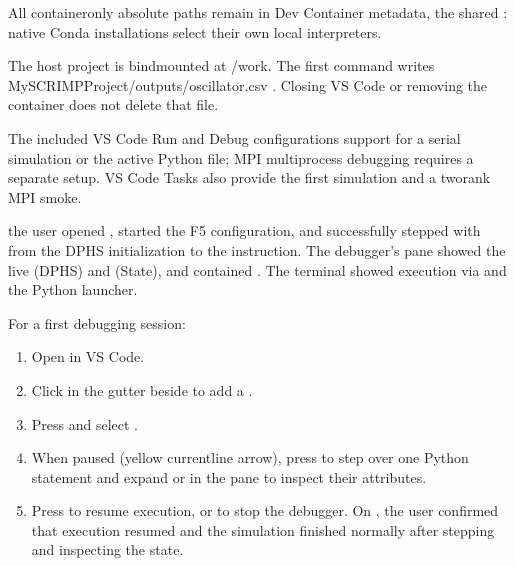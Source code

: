 \documentclass[letterpaper,10pt,english]{sphinxmanual}
\begin{document}
\sphinxAtStartPar
All container\sphinxhyphen{}only absolute paths remain in Dev Container
metadata,  the shared : native
Conda installations select their own local interpreters.

\sphinxAtStartPar
The host project is bind\sphinxhyphen{}mounted at /work. The first command
writes MySCRIMPProject/outputs/oscillator.csv .
Closing VS Code or removing the container does not delete that file.

\sphinxAtStartPar
The included VS Code Run and Debug configurations support 
for a serial simulation or the active Python file; MPI multiprocess
debugging requires a separate setup. VS Code Tasks also provide
the first simulation and a two\sphinxhyphen{}rank MPI smoke.

\sphinxAtStartPar
{} the user
opened , started the
 F5 configuration, and successfully
stepped with  from the DPHS initialization to the
 instruction. The
debugger’s  pane showed the live  (DPHS)
and  (State), and  contained .
The terminal showed execution via
 and the Python
 launcher.

\sphinxAtStartPar
For a first debugging session:
\begin{enumerate}
%
\item {} 
\sphinxAtStartPar
Open  in VS Code.

\item {} 
\sphinxAtStartPar
Click in the gutter beside 
to add a .

\item {} 
\sphinxAtStartPar
Press  and select .

\item {} 
\sphinxAtStartPar
When paused (yellow current\sphinxhyphen{}line arrow), press 
to step over one Python statement and expand 
or  in the  pane to inspect their attributes.

\item {} 
\sphinxAtStartPar
Press  to resume execution, or  to
stop the debugger. On , the user
confirmed that execution resumed and the simulation
finished normally after stepping and inspecting the state.

\end{enumerate}
\end{document}
